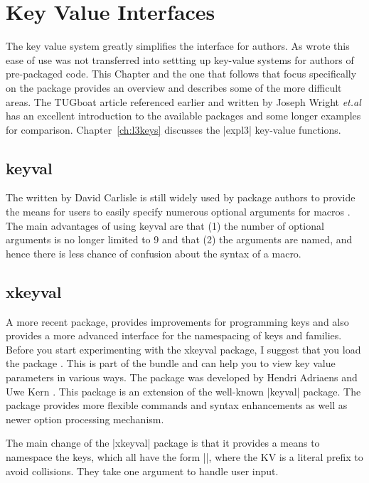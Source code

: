 \chapter{Key Value Interfaces}

The key value system greatly simplifies the \tex interface for authors. As \cite{joseph2009} wrote this ease of use was not transferred into settting up key-value systems for authors of pre-packaged \tex code. This Chapter and the one that follows that focus specifically on the  package provides an overview and describes some of the more difficult areas. The TUGboat article referenced earlier and written by Joseph Wright \textit{et.al} has an excellent introduction to the available packages and some longer examples for comparison. Chapter~\ref{ch:l3keys}
 discusses the |expl3| key-value functions.

\section{keyval}

The  written by David Carlisle is still widely used by package authors to provide the means for users to easily specify numerous optional arguments for macros \cite{keyval}. The main advantages of using keyval are that  (1) the number of optional arguments is no longer limited to 9 and that (2) the arguments are named, and hence there is less chance of confusion about the syntax of a macro.

\section{xkeyval}

A more recent package,  provides improvements for programming keys and  also
provides a more advanced interface for the namespacing of keys and families.
Before you start experimenting with the xkeyval package, I suggest that you load the package . This is part of the   bundle and can help you to view key value parameters in various ways. The  package was developed by Hendri Adriaens and Uwe Kern \citep{xkeyval}. This package is an extension of the well-known |keyval| package. The package provides more flexible commands and syntax enhancements as well as newer option processing mechanism.

The main change of the |xkeyval| package is that it provides a means to namespace the keys, which all have the form |\KV@family@keyname|, where the KV is a literal prefix to avoid collisions. They take one argument to handle user input.

